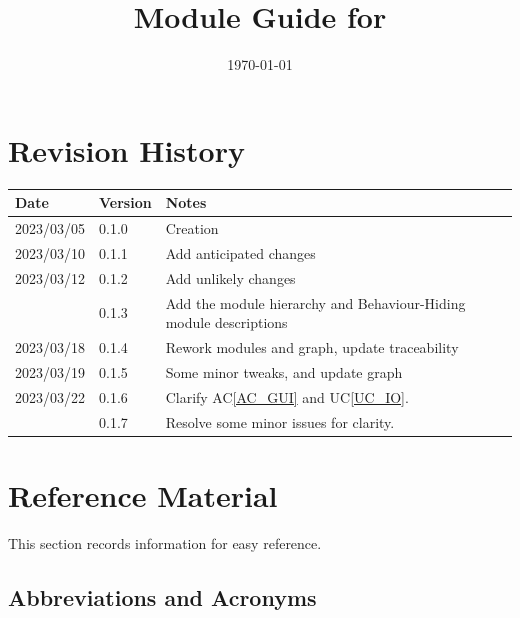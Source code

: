\documentclass[12pt, titlepage]{article}
\newcommand{\acref}[1]{AC\ref{#1}}
\newcommand{\uref}[1]{UC\ref{#1}}
\begin{document}
\title{Module Guide for \progname{}} 
\author{\authname}
\date{\today}

\maketitle


\section{Revision History}

\begin{tabularx}{\textwidth}{p{3cm}p{2cm}X}
\toprule {\bf Date} & {\bf Version} & {\bf Notes}\\
\midrule
2023/03/05 & 0.1.0 & Creation\\
2023/03/10 & 0.1.1 & Add anticipated changes\\
2023/03/12 & 0.1.2 & Add unlikely changes\\
           & 0.1.3 & Add the module hierarchy and Behaviour-Hiding module descriptions\\
2023/03/18 & 0.1.4 & Rework modules and graph, update traceability\\
2023/03/19 & 0.1.5 & Some minor tweaks, and update graph\\
2023/03/22 & 0.1.6 & Clarify \acref{AC_GUI} and \uref{UC_IO}.\\
           & 0.1.7 & Resolve some minor issues for clarity.\\
\bottomrule
\end{tabularx}

\newpage

\section{Reference Material}

This section records information for easy reference.

\subsection{Abbreviations and Acronyms}
\end{document}
